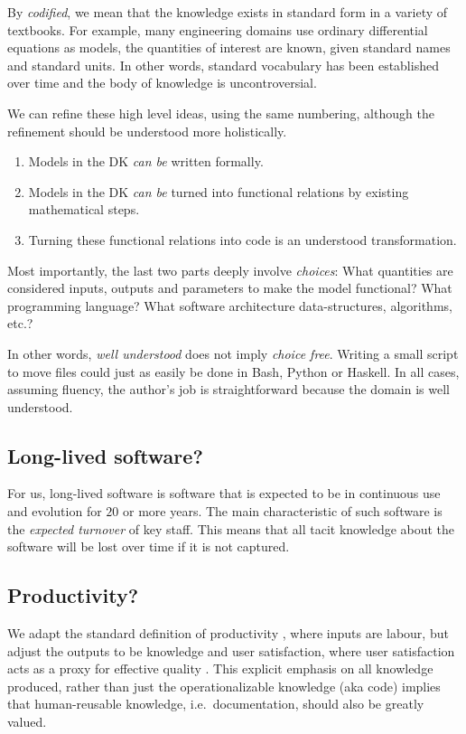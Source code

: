 \documentclass[sigconf,review,anonymous=false]{acmart}
\begin{document}
By \emph{codified}, we mean that the knowledge exists in standard form in a
variety of textbooks. For example, many engineering domains use
ordinary differential equations as models, the quantities of
interest are known, given standard names and standard units. In other words,
standard vocabulary has been established over time and the body of knowledge is
uncontroversial.

We can refine these high level ideas, using the same numbering,
although the refinement should be
understood more holistically.
\begin{enumerate}
\item Models in the DK \emph{can be} written formally.
\item Models in the DK \emph{can be} turned into functional relations by
 existing mathematical steps.
\item Turning these functional relations into code is an understood
 transformation.
\end{enumerate}
Most importantly, the last two parts
deeply involve \emph{choices}: What quantities are considered inputs, outputs
and parameters to make the model functional? What programming language?  What
software architecture data-structures, algorithms, etc.?

In other words,
\emph{well understood} does not imply \emph{choice free}.  Writing a small 
script to move files could just as easily be done in Bash, Python or Haskell.
In all cases, assuming fluency, the author's job is straightforward because
the domain is well understood.

\subsection{Long-lived software?}
For us, long-lived software is software that is expected to be in continuous
use and evolution for $20$ or more years. The main characteristic of
such software is the \emph{expected turnover} of key staff. This means that
all tacit knowledge about the software will be lost over time if it is not
captured.

\subsection{Productivity?}
We adapt the standard definition of productivity \cite{Boehm1987}, where inputs are labour,
but adjust the outputs to be knowledge and user satisfaction, where user
satisfaction acts as a proxy for effective quality
.
This explicit emphasis on all knowledge produced, rather than just the
operationalizable knowledge (aka code)
implies that human-reusable knowledge, i.e.\ documentation, should also be
greatly valued.
\end{document}
